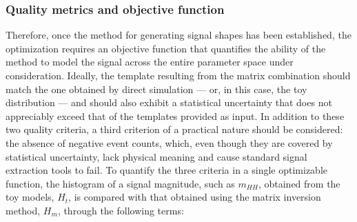 \subsubsection{Quality metrics and objective function}
\label{subsec:objective}
%
Therefore, once the method for generating signal shapes has been established, the optimization requires an objective function that quantifies the ability of the method to model the signal across the entire parameter space under consideration. Ideally, the template resulting from the matrix combination should match the one obtained by direct simulation — or, in this case, the toy distribution — and should also exhibit a statistical uncertainty that does not appreciably exceed that of the templates provided as input. In addition to these two quality criteria, a third criterion of a practical nature should be considered: the absence of negative event counts, which, even though they are covered by statistical uncertainty, lack physical meaning and cause standard signal extraction tools to fail. To quantify the three criteria in a single optimizable function, the histogram of a signal magnitude, such as $m_{HH}$, obtained from the toy models, $H_t$, is compared with that obtained using the matrix inversion method, $H_m$, through the following terms:
%
